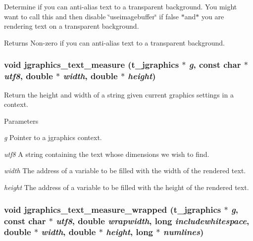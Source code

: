 Determine if you can anti-\/alias text to a transparent background. You might want to call this and then disable \char`\"{}useimagebuffer\char`\"{} if false $\ast$and$\ast$ you are rendering text on a transparent background.

\begin{DoxyReturn}{Returns}
Non-\/zero if you can anti-\/alias text to a transparent background. 
\end{DoxyReturn}
\hypertarget{group__jgraphics_ga3b8bb426e28bbc271f478ecc91f932f2}{
\subsubsection[{jgraphics\_\-text\_\-measure}]{\setlength{\rightskip}{0pt plus 5cm}void jgraphics\_\-text\_\-measure ({\bf t\_\-jgraphics} $\ast$ {\em g}, \/  const char $\ast$ {\em utf8}, \/  double $\ast$ {\em width}, \/  double $\ast$ {\em height})}}
\label{group__jgraphics_ga3b8bb426e28bbc271f478ecc91f932f2}


Return the height and width of a string given current graphics settings in a context. 
\begin{DoxyParams}{Parameters}
\item[{\em g}]Pointer to a jgraphics context. \item[{\em utf8}]A string containing the text whose dimensions we wish to find. \item[{\em width}]The address of a variable to be filled with the width of the rendered text. \item[{\em height}]The address of a variable to be filled with the height of the rendered text. \end{DoxyParams}
\hypertarget{group__jgraphics_gabe6cf107005eed13953f624fac4a3e25}{
\subsubsection[{jgraphics\_\-text\_\-measure\_\-wrapped}]{\setlength{\rightskip}{0pt plus 5cm}void jgraphics\_\-text\_\-measure\_\-wrapped ({\bf t\_\-jgraphics} $\ast$ {\em g}, \/  const char $\ast$ {\em utf8}, \/  double {\em wrapwidth}, \/  long {\em includewhitespace}, \/  double $\ast$ {\em width}, \/  double $\ast$ {\em height}, \/  long $\ast$ {\em numlines})}}
\label{group__jgraphics_gabe6cf107005eed13953f624fac4a3e25}


